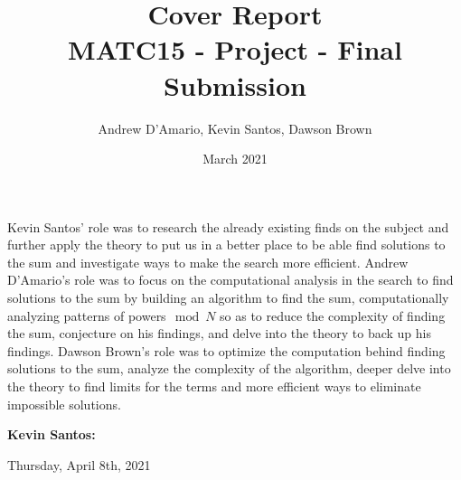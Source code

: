 \documentclass{article}
\title{Cover Report \\ \vspace{.3in} \large{MATC15 - Project - Final Submission}}
\author{Andrew D'Amario, Kevin Santos, Dawson Brown}
\date{March 2021}
\begin{document}
\maketitle

\begin{flushleft}



Kevin Santos' role was to research the already existing finds on the subject and further apply the theory to put us in a better place to be able find solutions to the sum and investigate ways to make the search more efficient.
Andrew D'Amario's role was to focus on the computational analysis in the search to find solutions to the sum by building an algorithm to find the sum, computationally analyzing patterns of powers$\mod N$ so as to reduce the complexity of finding the sum, conjecture on his findings, and delve into the theory to back up his findings.
Dawson Brown's role was to optimize the computation behind finding solutions to the sum, analyze the complexity of the algorithm, deeper delve into the theory to find limits for the terms and more efficient ways to eliminate impossible solutions.

\vspace{.5in}

{\bf Kevin Santos:}
\hspace{.63in}{\bf Dawson Brown:}
\hspace{.63in}{\bf Andrew D'Amario: }  


\vspace{1in}


Thursday, April 8th, 2021

\end{flushleft}
\end{document}
